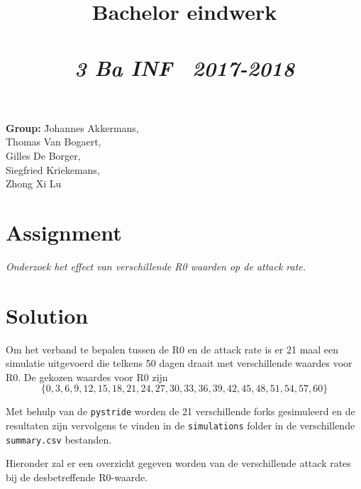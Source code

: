 \documentclass{article}
\title{\textmd{\textbf{Bachelor eindwerk}}\\\normalsize\vspace{0.1in}\Large{\projectnaam}\\\vspace{0.1in}\small{\textit{3 Ba INF \  2017-2018}}}
\author{}
\newcommand{\team}{
	\=Johannes Akkermans, \\\>Thomas Van Bogaert, \\\>Gilles De Borger, \\\>Siegfried Kriekemans, \\\>Zhong Xi Lu
}
\begin{document}
\maketitle

\begin{center}
	\parbox{0cm}{
		\begin{tabbing}
		\textbf{Group:} \team
		\end{tabbing}
	}
\end{center}

\newpage
\section{Assignment}
\begin{center}
	\textit{Onderzoek het effect van verschillende R0 waarden op de attack rate.}
\end{center}

\section{Solution}
Om het verband te bepalen tussen de R0 en de attack rate is er 21 maal een simulatie uitgevoerd die telkens 50 dagen draait met verschillende waardes voor R0. De gekozen waardes voor R0 zijn 
$$\{0, 3, 6, 9, 12, 15, 18, 21, 24, 27, 30, 33, 36, 39, 42, 45, 48, 51, 54, 57, 60 \} $$

Met behulp van de \texttt{pystride} worden de 21 verschillende forks gesimuleerd en de resultaten zijn vervolgens te vinden in de \texttt{simulations} folder in de verschillende \texttt{summary.csv} bestanden. 

Hieronder zal er een overzicht gegeven worden van de verschillende attack rates bij de desbetreffende R0-waarde.
\end{document}
